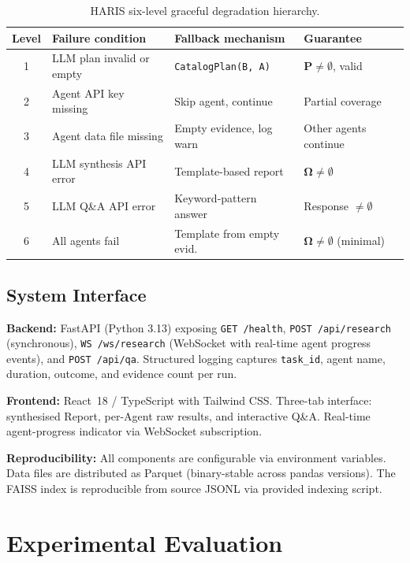 \documentclass[preprint,12pt]{elsarticle}
\renewcommand{\P}{\mathbf{P}}
\newcommand{\Om}{\boldsymbol{\Omega}}
\begin{document}
\begin{table}[t]
\centering
\caption{HARIS six-level graceful degradation hierarchy.}
\label{tab:degradation}
\begin{tabularx}{\columnwidth}{clXl}
\toprule
\textbf{Level} & \textbf{Failure condition} & \textbf{Fallback mechanism} & \textbf{Guarantee} \\
\midrule
1 & LLM plan invalid or empty & \texttt{CatalogPlan(B, A)} & $\P \ne \emptyset$, valid \\
2 & Agent API key missing    & Skip agent, continue       & Partial coverage \\
3 & Agent data file missing  & Empty evidence, log warn   & Other agents continue \\
4 & LLM synthesis API error  & Template-based report      & $\Om \ne \emptyset$ \\
5 & LLM Q\&A API error       & Keyword-pattern answer     & Response $\ne \emptyset$ \\
6 & All agents fail          & Template from empty evid.  & $\Om \ne \emptyset$ (minimal) \\
\bottomrule
\end{tabularx}
\end{table}

\subsection{System Interface}

\textbf{Backend:} FastAPI (Python 3.13) exposing \texttt{GET /health},
\texttt{POST /api/research} (synchronous), \texttt{WS /ws/research} (WebSocket
with real-time agent progress events), and \texttt{POST /api/qa}. Structured
logging captures \texttt{task\_id}, agent name, duration, outcome, and evidence
count per run.

\textbf{Frontend:} React~18 / TypeScript with Tailwind CSS. Three-tab interface:
synthesised Report, per-Agent raw results, and interactive Q\&A. Real-time
agent-progress indicator via WebSocket subscription.

\textbf{Reproducibility:} All components are configurable via environment
variables. Data files are distributed as Parquet (binary-stable across pandas
versions). The FAISS index is reproducible from source JSONL via provided
indexing script.

\section{Experimental Evaluation}
\label{sec:eval}
\end{document}
